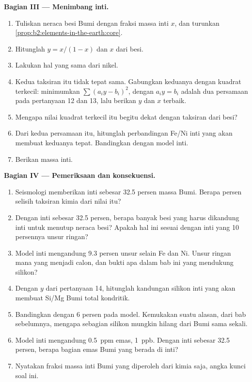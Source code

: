 \begin{problem}
\noindent\textbf{Bagian III --- Menimbang inti.}
\begin{enumerate}[resume]
\item Tuliskan neraca besi Bumi dengan fraksi massa inti $x$, dan
turunkan \cref{prop:b2:elements-in-the-earth:core}.
\item Hitunglah $y = x/(1-x)$ dan $x$ dari besi.
\item Lakukan hal yang sama dari nikel.
\item Kedua taksiran itu tidak tepat sama. Gabungkan keduanya dengan kuadrat terkecil:
minimumkan $\sum (a_iy - b_i)^2$, dengan $a_i y = b_i$ adalah dua persamaan pada
pertanyaan 12 dan 13, lalu berikan $y$ dan $x$ terbaik.
\item Mengapa nilai kuadrat terkecil itu begitu dekat dengan taksiran dari besi?
\item Dari kedua persamaan itu, hitunglah perbandingan Fe/Ni inti yang akan membuat
keduanya tepat. Bandingkan dengan model inti.
\item Berikan massa inti.
\end{enumerate}

\noindent\textbf{Bagian IV --- Pemeriksaan dan konsekuensi.}
\begin{enumerate}[resume]
\item Seismologi memberikan inti sebesar 32.5 persen massa Bumi. Berapa
persen selisih taksiran kimia dari nilai itu?
\item Dengan inti sebesar 32.5 persen, berapa banyak besi yang harus dikandung inti untuk
menutup neraca besi? Apakah hal ini sesuai dengan inti yang 10 persennya unsur
ringan?
\item Model inti mengandung 9.3 persen unsur selain Fe dan Ni. Unsur ringan mana
yang menjadi calon, dan bukti apa dalam bab ini yang mendukung silikon?
\item Dengan $y$ dari pertanyaan 14, hitunglah kandungan silikon inti yang akan
membuat Si/Mg Bumi total kondritik.
\item Bandingkan dengan 6 persen pada model. Kemukakan suatu alasan, dari bab
sebelumnya, mengapa sebagian silikon mungkin hilang dari Bumi sama sekali.
\item Model inti mengandung \qty{0.5}{ppm} emas, 
\qty{1}{ppb}. Dengan inti sebesar 32.5 persen, berapa bagian emas Bumi yang
berada di inti?
\item Nyatakan fraksi massa inti Bumi yang diperoleh dari kimia saja,
angka kunci soal ini.
\end{enumerate}
\end{problem}
